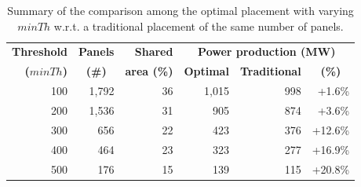 

\begin{table}[!tbp]
\centering
\caption{Summary of the comparison among the optimal placement with varying $minTh$ w.r.t. a traditional placement of the same number of panels.}
\label{tab:production}
\begin{tabular}{|r|r|r|r|r|r|}
\hline
\textbf{Threshold} & \textbf{Panels} &\textbf{Shared} & \multicolumn{3}{c|}{\textbf{Power production (MW)}} \\
\cline{4-6}
\textbf{($minTh$)} & \multicolumn{1}{c|}{\textbf{(\#)}} & \multicolumn{1}{c|}{\textbf{area (\%)}}& \textbf{Optimal} & \multicolumn{1}{c|}{\textbf{Traditional}} & \multicolumn{1}{c|}{\textbf{(\%)}}\\
\hline\hline
100 & 1,792 &36 & 1,015 & 998 & +1.6\% \\\hline
200 & 1,536 &31 & 905 & 874 & +3.6\% \\\hline
300 & 656 &22 & 423 & 376 & +12.6\% \\\hline
400 & 464 &23 & 323 & 277 & +16.9\% \\\hline
500 & 176 &15 & 139 & 115 & +20.8\% \\\hline
\end{tabular}%
\end{table}

